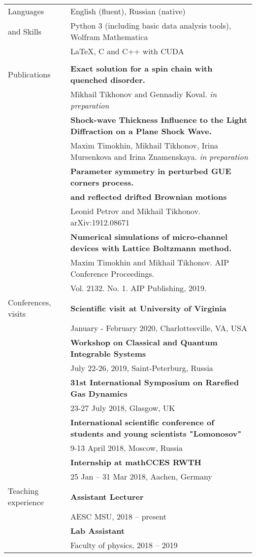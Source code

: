 \documentclass[letterpaper,10pt,oneside,utf8]{article}
\begin{document}
\begin{tabular}{@{} l l}
		\Large{Languages}   & English (fluent), Russian (native) \\
		\Large{and Skills}    	&Python 3 (including basic data analysis tools),  Wolfram Mathematica \\
		& \LaTeX, C and C++ with CUDA\\
		&\\
		\Large{Publications}  
		&\textbf{Exact solution for a spin chain with quenched disorder. }\\&  Mikhail Tikhonov and Gennadiy Koval. \textit{in preparation} \\
		&\textbf{Shock-wave Thickness Influence to the Light Diffraction on a Plane Shock Wave.}\\&
		Maxim Timokhin, Mikhail Tikhonov, Irina Mursenkova and Irina Znamenskaya. \textit{in preparation}\\
		&\textbf{Parameter symmetry in perturbed GUE corners process.	}\\&\textbf{and reflected drifted Brownian motions}\\& Leonid Petrov and  Mikhail Tikhonov. arXiv:1912.08671\\
		&\textbf{Numerical simulations of micro-channel devices with Lattice Boltzmann method. }\\
		&Maxim Timokhin  and Mikhail Tikhonov. AIP Conference Proceedings. \\
		&Vol. 2132. No. 1. AIP Publishing, 2019.\\
		\Large{Conferences, visits} 
		&\textbf{Scientific visit at University of Virginia}\\
		& January - February 2020, Charlottesville, VA, USA  \\
		&\textbf{Workshop on Classical and Quantum Integrable Systems}\\
		&July 22-26, 2019, Saint-Peterburg, Russia\\
		& \textbf{31st International Symposium on Rarefied Gas Dynamics}\\
		& 23-27 July 2018, Glasgow, UK\\
		&\textbf{International scientific conference of students and young scientists "Lomonosov"}\\
		& 9-13 April 2018,  Moscow, Russia\\
		&\textbf{Internship at mathCCES RWTH}\\
		& 25 Jan -- 31 Mar 2018, Aachen, Germany \\

		\Large{Teaching experience}&
		\textbf{Assistant Lecturer}\\
		&AESC MSU, 2018 -- present\\
		&\textbf{Lab Assistant}\\
		&Faculty of physics, 2018 -- 2019\\

		
		
	\end{tabular}
\end{document}
